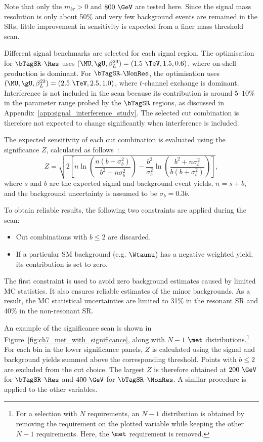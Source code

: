 Note that only the $m_{b\tau}>0$ and $800~\GeV$ are tested here. Since the signal mass resolution is only about 50\% and very few background events are remained in the SRs, little improvement in sensitivity is expected from a finer mass threshold scan.

Different signal benchmarks are selected for each signal region. The optimisation for $\bTagSR$-$\Res$ uses $(\MU,\gU,\beta_L^{23})=(1.5~\TeV,1.5,0.6)$, where on-shell production is dominant.
For $\bTagSR$-$\NonRes$, the optimisation uses $(\MU,\gU,\beta_L^{23})=(2.5~\TeV,2.5,1.0)$, where $t$-channel exchange is dominant.
Interference is not included in the scan because its contribution is around $5$--$10\%$ in the parameter range probed by the $\bTagSR$ regions, as discussed in Appendix~\ref{app:signal_interference_study}. The selected cut combination is therefore not expected to change significantly when interference is included.

The expected sensitivity of each cut combination is evaluated using the significance $Z$, calculated as follows~\cite{ATL-PHYS-PUB-2020-025}:
\begin{equation}
    Z = \sqrt{2\left[n\ln\!\left(\frac{n(b+\sigma_b^2)}{b^2+n\sigma_b^2}\right)-\frac{b^2}{\sigma_b^2}\ln\!\left(\frac{b^2+n\sigma_b^2}{b(b+\sigma_b^2)}\right)\right]},
    \label{eq:ch7_optimisation_significance}
\end{equation}
where $s$ and $b$ are the expected signal and background event yields, $n=s+b$, and the background uncertainty is assumed to be $\sigma_b=0.3b$.

To obtain reliable results, the following two constraints are applied during the scan:
\begin{itemize}
    \item Cut combinations with $b\leq2$ are discarded.
    \item If a particular SM background (e.g. $\Wtaunu$) has a negative weighted yield, its contribution is set to zero.
\end{itemize}
The first constraint is used to avoid zero background estimates caused by limited MC statistics. It also ensures reliable estimates of the minor backgrounds. As a result, the MC statistical uncertainties are limited to 31\% in the resonant SR and 40\% in the non-resonant SR.

An example of the significance scan is shown in Figure~\ref{fig:ch7_met_with_significance}, along with $N-1$ $\met$ distributions.\footnote{For a selection with $N$ requirements, an $N-1$ distribution is obtained by removing the requirement on the plotted variable while keeping the other $N-1$ requirements. Here, the $\met$ requirement is removed.}
For each bin in the lower significance panels, $Z$ is calculated using the signal and background yields summed above the corresponding threshold. Points with $b\leq2$ are excluded from the cut choice.
The largest $Z$ is therefore obtained at $200~\GeV$ for $\bTagSR$-$\Res$ and $400~\GeV$ for $\bTagSR$-$\NonRes$. A similar procedure is applied to the other variables.


